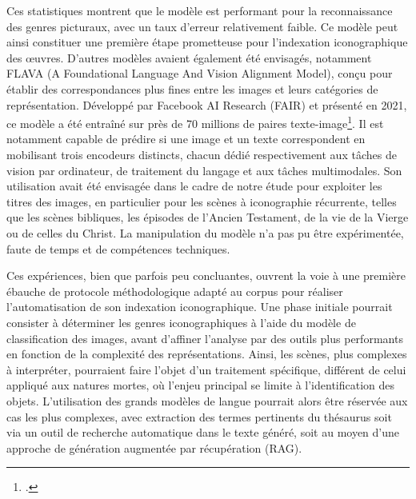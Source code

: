 Ces statistiques montrent que le modèle est performant pour la reconnaissance des genres picturaux, avec un taux d’erreur relativement faible. Ce modèle peut ainsi constituer une première étape prometteuse pour l’indexation iconographique des œuvres.
D’autres modèles avaient également été envisagés, notamment FLAVA (A Foundational Language And Vision Alignment Model), conçu pour établir des correspondances plus fines entre les images et leurs catégories de représentation. Développé par Facebook AI Research (FAIR) et présenté en 2021, ce modèle a été entraîné sur près de 70 millions de paires texte-image\footcite{singhFLAVAFoundationalLanguage2021}. Il est notamment capable de prédire si une image et un texte correspondent en mobilisant trois encodeurs distincts, chacun dédié respectivement aux tâches de vision par ordinateur, de traitement du langage et aux tâches multimodales. Son utilisation avait été envisagée dans le cadre de notre étude pour exploiter les titres des images, en particulier pour les scènes à iconographie récurrente, telles que les scènes bibliques, les épisodes de l’Ancien Testament, de la vie de la Vierge ou de celles du Christ. La manipulation du modèle n’a pas pu être expérimentée, faute de temps et de compétences techniques.

Ces expériences, bien que parfois peu concluantes, ouvrent la voie à une première ébauche de protocole méthodologique adapté au corpus pour réaliser l’automatisation de son indexation iconographique. Une phase initiale pourrait consister à déterminer les genres iconographiques à l’aide du modèle de classification des images, avant d’affiner l’analyse par des outils plus performants en fonction de la complexité des représentations. Ainsi, les scènes, plus complexes à interpréter, pourraient faire l’objet d’un traitement spécifique, différent de celui appliqué aux natures mortes, où l’enjeu principal se limite à l’identification des objets. L’utilisation des grands modèles de langue pourrait alors être réservée aux cas les plus complexes, avec extraction des termes pertinents du thésaurus soit via un outil de recherche automatique dans le texte généré, soit au moyen d’une approche de génération augmentée par récupération (RAG).

